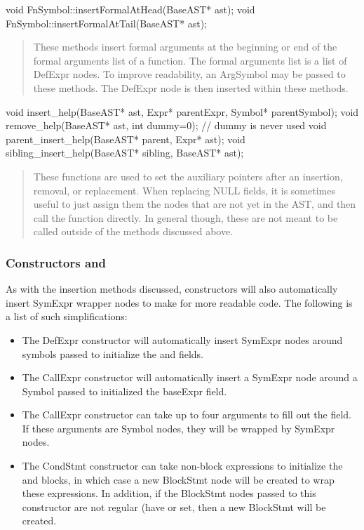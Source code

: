 \documentclass[10pt]{article}
\begin{document}
\begin{clang}
void FnSymbol::insertFormalAtHead(BaseAST* ast);
void FnSymbol::insertFormalAtTail(BaseAST* ast);
\end{clang}
\begin{quote}
These methods insert formal arguments at the beginning or end of the
formal arguments list of a function.  The formal arguments list is a
list of DefExpr nodes.  To improve readability, an ArgSymbol may be
passed to these methods.  The DefExpr node is then inserted within
these methods.
\end{quote}

\begin{clang}
void insert_help(BaseAST* ast, Expr* parentExpr, Symbol* parentSymbol);
void remove_help(BaseAST* ast, int dummy=0); // dummy is never used
void parent_insert_help(BaseAST* parent, Expr* ast);
void sibling_insert_help(BaseAST* sibling, BaseAST* ast);
\end{clang}
\begin{quote}
These functions are used to set the auxiliary pointers after an insertion,
removal, or replacement.  When replacing NULL fields, it is sometimes
useful to just assign them the nodes that are not yet in the AST, and
then call the  function directly.  In general though,
these are not meant to be called outside of the methods discussed
above.
\end{quote}

\subsubsection{Constructors and }
\label{sec:constructors}

As with the insertion methods discussed, constructors will also
automatically insert SymExpr wrapper nodes to make for more readable
code.  The following is a list of such simplifications:
\begin{itemize}
\item The DefExpr constructor will automatically insert SymExpr nodes
  around symbols passed to initialize the  and 
  fields.
\item The CallExpr constructor will automatically insert a SymExpr
  node around a Symbol passed to initialized the baseExpr field.
\item The CallExpr constructor can take up to four arguments to fill
  out the  field.  If these arguments are Symbol nodes,
  they will be wrapped by SymExpr nodes.
\item The CondStmt constructor can take non-block expressions to
  initialize the  and  blocks, in which case
  a new BlockStmt node will be created to wrap these expressions.  In
  addition, if the BlockStmt nodes passed to this constructor are not
  regular (have  or  set, then a new
  BlockStmt will be created.
\end{itemize}
\end{document}
